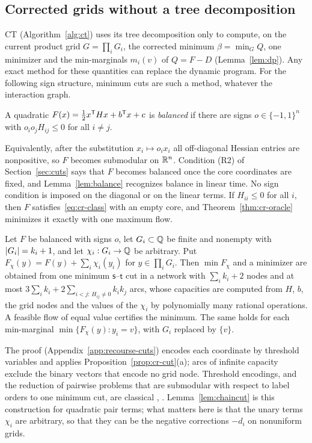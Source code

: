 \subsection{Corrected grids without a tree decomposition}\label{sec:balanced}

CT (Algorithm~\ref{alg:ct}) uses its tree decomposition only to compute, on
the current product grid $G=\prod_iG_i$, the corrected minimum
$\beta=\min_GQ$, one minimizer and the min-marginals $m_i(v)$ of $Q=F-D$
(Lemma~\ref{lem:dp}). Any exact method for these quantities can replace the
dynamic program. For the following sign structure, minimum cuts are such a
method, whatever the interaction graph.

\begin{definition}\label{def:balanced}
A quadratic $F(x)=\frac12x^{\mathsf T}Hx+b^{\mathsf T}x+c$ is \emph{balanced} if there are
signs $o\in\{-1,1\}^n$ with $o_io_jH_{ij}\le0$ for all $i\ne j$.
\end{definition}

Equivalently, after the substitution $x_i\mapsto o_ix_i$ all off-diagonal
Hessian entries are nonpositive, so $F$ becomes submodular on $\mathbb R^n$.
Condition (R2) of Section~\ref{sec:cuts} says that $F$ becomes balanced once
the core coordinates are fixed, and Lemma~\ref{lem:balance} recognizes
balance in linear time.
No sign condition is imposed on the diagonal or on the linear terms. If
$H_{ii}\le0$ for all $i$, then $F$ satisfies~\eqref{eq:cr-class} with an
empty core, and Theorem~\ref{thm:cr-oracle} minimizes it exactly with one
maximum flow.

\begin{lemma}\label{lem:chaincut}
Let $F$ be balanced with signs $o$, let $G_i\subset\mathbb Q$ be finite and
nonempty with $\lvert G_i\rvert=k_i+1$, and let $\chi_i:G_i\to\mathbb Q$ be arbitrary. Put
$F_\chi(y)=F(y)+\sum_i\chi_i(y_i)$ for $y\in\prod_iG_i$. Then $\min F_\chi$
and a minimizer are obtained from one minimum $\mathsf s$--$\mathsf t$ cut in
a network with $\sum_ik_i+2$ nodes and at most
$3\sum_ik_i+2\sum_{i<j:\,H_{ij}\ne0}k_ik_j$ arcs, whose capacities are
computed from $H$, $b$, the grid nodes and the values of the $\chi_i$ by
polynomially many rational operations. A feasible flow of equal value
certifies the minimum. The same holds for each min-marginal
$\min\{F_\chi(y):y_i=v\}$, with $G_i$ replaced by $\{v\}$.
\end{lemma}

The proof (Appendix~\ref{app:recourse-cuts}) encodes each coordinate by
threshold variables and applies Proposition~\ref{prop:cr-cut}(a); arcs of
infinite capacity exclude the binary vectors that encode no grid node.
Threshold encodings, and the reduction of pairwise problems that are
submodular with respect to label orders to one minimum cut, are classical
\cite[Sections~3--4]{SchlesingerFlach2006}, \cite{Ishikawa2003}.
Lemma~\ref{lem:chaincut} is this construction for quadratic pair terms; what
matters here is that the unary terms $\chi_i$ are arbitrary, so that they
can be the negative corrections $-d_i$ on nonuniform grids.

